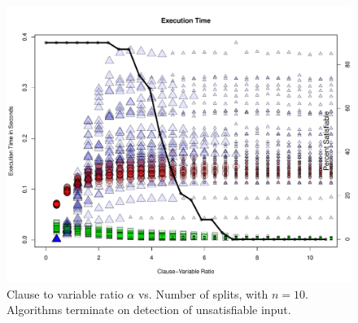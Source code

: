 \begin{figure}[htdp]

\begin{center}

\includegraphics[width=1.1\textwidth]{./figures/metricOutput_n10/executionTime.pdf}

\caption{Clause to variable ratio $\alpha$ vs. Number of splits, with $n = 10$.  Algorithms terminate on detection of unsatisfiable input. }
\label{timeFig_10}
\end{center}
\end{figure}

\FloatBarrier
			
